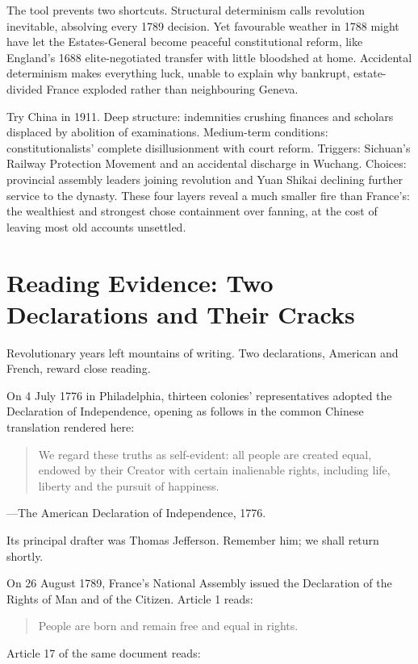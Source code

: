 The tool prevents two shortcuts. Structural determinism calls revolution inevitable, absolving every 1789 decision. Yet favourable weather in 1788 might have let the Estates-General become peaceful constitutional reform, like England's 1688 elite-negotiated transfer with little bloodshed at home. Accidental determinism makes everything luck, unable to explain why bankrupt, estate-divided France exploded rather than neighbouring Geneva.

Try China in 1911. Deep structure: indemnities crushing finances and scholars displaced by abolition of examinations. Medium-term conditions: constitutionalists' complete disillusionment with court reform. Triggers: Sichuan's Railway Protection Movement and an accidental discharge in Wuchang. Choices: provincial assembly leaders joining revolution and Yuan Shikai declining further service to the dynasty. These four layers reveal a much smaller fire than France's: the wealthiest and strongest chose containment over fanning, at the cost of leaving most old accounts unsettled.

\section[Two Declarations and Their Cracks]{Reading Evidence: Two Declarations and Their Cracks}
Revolutionary years left mountains of writing. Two declarations, American and French, reward close reading.

On 4 July 1776 in Philadelphia, thirteen colonies' representatives adopted the Declaration of Independence, opening as follows in the common Chinese translation rendered here:

\begin{quote}
We regard these truths as self-evident: all people are created equal, endowed by their Creator with certain inalienable rights, including life, liberty and the pursuit of happiness.
\end{quote}
---The American Declaration of Independence, 1776.

Its principal drafter was Thomas Jefferson. Remember him; we shall return shortly.

On 26 August 1789, France's National Assembly issued the Declaration of the Rights of Man and of the Citizen. Article 1 reads:

\begin{quote}
People are born and remain free and equal in rights.
\end{quote}
Article 17 of the same document reads:

